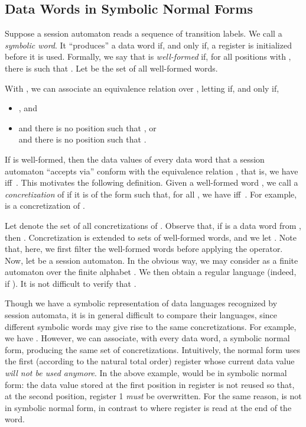 \documentclass{LMCS}
\begin{document}
\subsection{Data Words in Symbolic Normal Forms}

Suppose a session automaton reads a sequence  of transition labels. We
call  a \emph{symbolic word}.  It ``produces'' a data word if, and
only if, a register is initialized before it is used. Formally, we say
that  is \emph{well-formed} if, for all positions 
with , there is 
such that .  Let  be the set of all well-formed words.

With , we can associate an equivalence
relation  over , letting  if,
and only if,
\begin{itemize}
\item , and
\item  and there is no position  such that , or\\
   and there is no position  such
  that .
\end{itemize}
If  is well-formed, then the data values of every data word
 that a session automaton ``accepts
via''  conform with the equivalence relation , that is, we
have  iff\ .
This motivates the following definition.
Given a well-formed word , we call 
a \emph{concretization} of  if it is of the form 
such that, for all , we have 
iff\ . For
example,  is a concretization of
.

Let  denote the set of all concretizations of
. Observe that, if  is a data word from , then
. Concretization is extended to sets  of well-formed words, and we let
. Note
that, here, we first filter the well-formed words before applying the
operator.
Now, let  be a session
automaton. In the obvious way, we may consider  as a finite
automaton over the finite alphabet . We then obtain a regular language  (indeed,  if ).  It is not
difficult to verify that .

Though we have a symbolic representation of data languages recognized
by session automata, it is in general difficult to compare their
languages, since different symbolic words may give rise to the
same concretizations. For example, we have
. However, we can
associate, with every data word, a symbolic normal form, producing
the same set of concretizations. Intuitively, the normal form uses the
first (according to the natural total order) register whose current
data value \emph{will not be used anymore}. In the above example,
 would be in symbolic normal
form: the data value stored at the first position in register  is
not reused so that, at the second position, register 1 \emph{must} be
overwritten. For the same reason,
 is not in symbolic normal
form, in contrast to
 where register
 is read at the end of the word.
\end{document}
